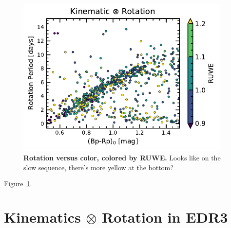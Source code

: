 \documentclass[12pt,twocolumn,tighten]{aastex63}
\begin{document}
\begin{figure}[t]
	\begin{center}
		\leavevmode
		\includegraphics[width=0.95\textwidth]{f6.pdf}
	\end{center}
	\vspace{-0.7cm}
	\caption{ {\bf Rotation versus color, colored by RUWE.}
		Looks like on the slow sequence, there's more yellow at the bottom?
		\label{fig:rotn_X_RUWE}
	}
\end{figure}

Figure~\ref{fig:rotn_X_RUWE}.


\section{Kinematics $\otimes$ Rotation in EDR3}
\end{document}
